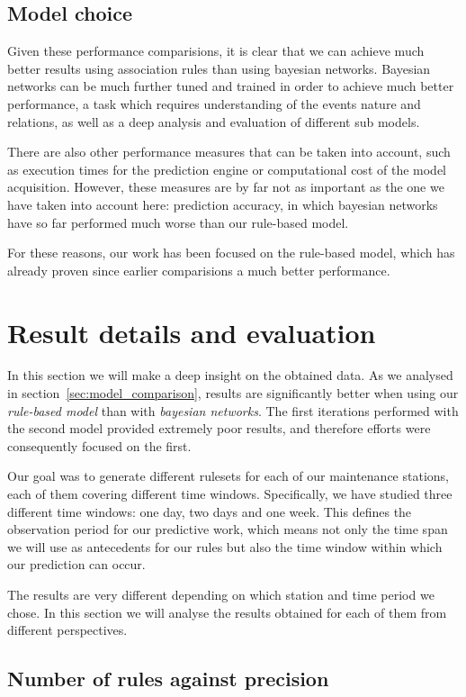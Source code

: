 \documentclass[a4paper,12pt]{article}
\begin{document}
\subsection{Model choice}
Given these performance comparisions, it is clear that we can achieve much better results using association rules than using bayesian networks. Bayesian networks can be much further tuned and trained in order to achieve much better performance, a task which requires understanding of the events nature and relations, as well as a deep analysis and evaluation of different sub models.

There are also other performance measures that can be taken into account, such as execution times for the prediction engine or computational cost of the model acquisition. However, these measures are by far not as important as the one we have taken into account here: prediction accuracy, in which bayesian networks have so far performed much worse than our rule-based model. 

For these reasons, our work has been focused on the rule-based model, which has already proven since earlier comparisions a much better performance.

\section{Result details and evaluation}
In this section we will make a deep insight on the obtained data. As we analysed in section~\ref{sec:model_comparison}, results are significantly better when using our \emph{rule-based model} than with \emph{bayesian networks}. The first iterations performed with the second model provided extremely poor results, and therefore efforts were consequently focused on the first.

Our goal was to generate different rulesets for each of our maintenance stations, each of them covering different time windows. Specifically, we have studied three different time windows: one day, two days and one week. This defines the observation period for our predictive work, which means not only the time span we will use as antecedents for our rules but also the time window within which our prediction can occur.

The results are very different depending on which station and time period we chose. In this section we will analyse the results obtained for each of them from different perspectives.

\subsection{Number of rules against precision}


\clearpage

 

\end{document}
